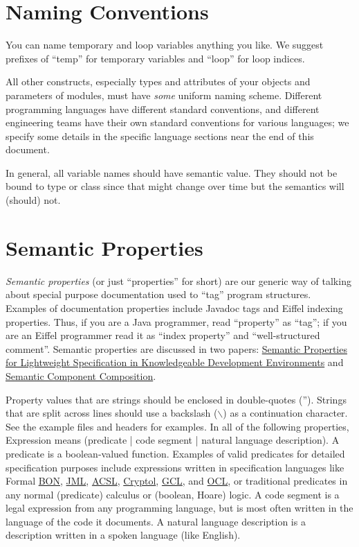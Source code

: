 \documentclass[10pt,letter]{article}
\begin{document}
\section{Naming Conventions}

You can name temporary and loop variables anything you like. We suggest prefixes of ``temp'' for temporary variables and ``loop'' for loop indices.

All other constructs, especially types and attributes of your objects and parameters of modules, must have \textit{some} uniform naming scheme. Different programming languages have different standard conventions, and different engineering teams have their own standard conventions for various languages; we specify some details in the specific language sections near the end of this document.

In general, all variable names should have semantic value. They should not be bound to type or class since that might change over time but the semantics will (should) not.

\section{Semantic Properties}

\textit{Semantic properties} (or just ``properties'' for short) are our generic way of talking about special purpose documentation used to ``tag'' program structures. Examples of documentation properties include Javadoc tags and Eiffel indexing properties. Thus, if you are a Java programmer, read ``property'' as ``tag''; if you are an Eiffel programmer read it as ``index property'' and ``well-structured comment''.
Semantic properties are discussed in two papers: \href{https://www.arxiv.org/abs/cs.SE/0204035}{Semantic Properties for Lightweight Specification in Knowledgeable Development Environments} and \href{https://www.arxiv.org/abs/cs.SE/0204036}{Semantic Component Composition}.

Property values that are strings should be enclosed in double-quotes (''). Strings that are split across lines should use a backslash ($\backslash$) as a continuation character. See the example files and headers for examples.
In all of the following properties, Expression means (predicate | code segment | natural language description). A predicate is a boolean-valued function. Examples of valid predicates for detailed specification purposes include expressions written in specification languages like Formal \href{https://www.bon-method.com/}{BON}, \href{https://www.jmlspecs.org/}{JML}, \href{https://frama-c.com/html/acsl.html}{ACSL}, \href{https://cryptol.net/}{Cryptol}, \href{https://galois.com/project/gumbo/}{GCL}, and \href{https://www.omg.org/spec/OCL/}{OCL}, or traditional predicates in any normal (predicate) calculus or (boolean, Hoare) logic. A code segment is a legal expression from any programming language, but is most often written in the language of the code it documents. A natural language description is a description written in a spoken language (like English).
\end{document}
